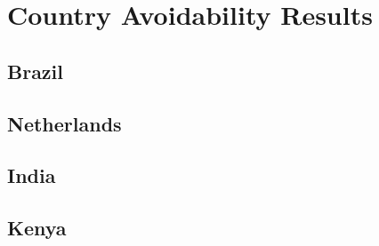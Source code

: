 \section{Country Avoidability Results}
\label{avoid_results}

\subsection{Brazil}


\subsection{Netherlands}


\subsection{India}


\subsection{Kenya}


